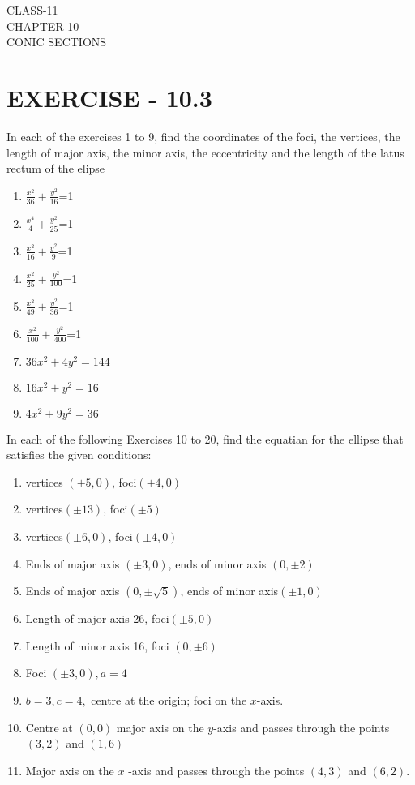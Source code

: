 \documentclass[12pt]{article}
\begin{document}
\begin{center}
\textbf\large{CLASS-11\\CHAPTER-10 \\ CONIC SECTIONS}
\end{center}

\section*{EXERCISE - 10.3}
In each of the exercises 1 to 9, find the coordinates of the foci, the vertices, the length of major axis, the minor axis, the eccentricity and the length of the latus rectum of the elipse
\begin{enumerate} 
\item $\frac{x^2}{36}+\frac{y^2}{16}$=1
\item $\frac{x^4}{4}+\frac{y^2}{25}$=1
\item $\frac{x^2}{16}+\frac{y^2}{9}$=1
\item $\frac{x^2}{25}+\frac{y^2}{100}$=1
\item $\frac{x^2}{49}+\frac{y^2}{36}$=1
\item $\frac{x^2}{100}+\frac{y^2}{400}$=1
\item $36x^2+4y^2=144$
\item $16x^2+y^2=16$
\item $4x^2+9y^2=36$
\end{enumerate}
In each of the following  Exercises 10 to 20, find the equatian for the ellipse that satisfies the given conditions:
\begin{enumerate}[resume]
\item vertices $(\pm5,0)$, foci$(\pm4,0)$
\item vertices$(\pm13)$, foci$(\pm5)$
\item vertices$(\pm6,0)$, foci$(\pm4,0)$
\item Ends of major axis $(\pm3,0)$, ends of minor axis $(0,\pm2)$
\item Ends of major axis $(0,\pm\sqrt{5})$, ends of minor axis$(\pm1,0)$
\item Length of major axis 26, foci$(\pm5,0)$
\item Length of minor axis 16, foci $(0,\pm6)$
\item Foci $(\pm3,0), a=4$
\item $b=3, c=4,$ centre at the origin; foci on the $x$-axis.
\item  Centre at $(0,0)$ major axis on the $y$-axis and passes through the points $(3,2)$ and $(1,6)$
\item Major axis on the $x$ -axis and passes through the points $(4,3)$ and $(6,2)$.
\end{enumerate}
\end{document}

